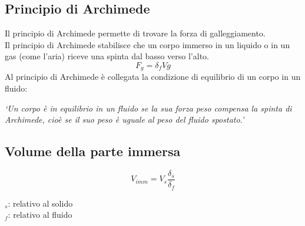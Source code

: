 \subsection{Principio di Archimede}
Il principio di Archimede permette di trovare la forza di galleggiamento.\\
Il principio di Archimede stabilisce che un corpo immerso in un liquido o in un gas (come l'aria) 
riceve una spinta dal basso verso l'alto.
\begin{equation*}
F_g = \delta_fVg
\end{equation*}
Al principio di Archimede è collegata la condizione di equilibrio di un corpo in un fluido:\\
\begin{center}
	\emph{`Un corpo è in equilibrio in un fluido se la sua forza peso compensa la spinta di 
		Archimede, cioè se il suo peso è uguale al peso del fluido spostato.'}
\end{center}

\subsection{Volume della parte immersa}
\begin{equation*}
V_{imm} = V_s\frac{\delta_s}{\delta_f}
\end{equation*}
\begin{center}
\end{center}

$_s$: relativo al solido\\
$_f$: relativo al fluido
